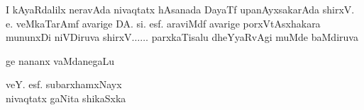 \begin{center}
\noindent I kAyaRdalilx neravAda nivaqtatx hAsanada DayaTf upanAyxsakarAda shirxV. e. veMkaTarAmf avarige DA. si. esf. araviMdf avarige porxVtAsxhakara mununxDi niVDiruva shirxV$\ldots\ldots$ parxkaTisalu dheYyaRvAgi muMde baMdiruva 
\end{center}

\begin{flushleft}
ge nananx vaMdanegaLu
\end{flushleft}

\begin{flushright}
veY. esf. subarxhamxNayx\\
nivaqtatx gaNita shikaSxka
\end{flushright}

\newpage

